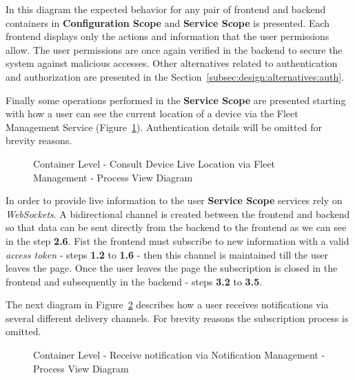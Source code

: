 In this diagram the expected behavior for any pair of frontend and backend containers in \textbf{Configuration Scope} and \textbf{Service Scope} is presented. Each frontend displays only the actions and information that the user permissions allow. The user permissions are once again verified in the backend to secure the system against malicious accesses. Other alternatives related to authentication and authorization are presented in the Section~\ref{subsec:design:alternatives:auth}.

Finally some operations performed in the \textbf{Service Scope} are presented starting with how a user can see the current location of a device via the Fleet Management Service (Figure~\ref{fig:design:architecture:container:process:diagram:fleet}). Authentication details will be omitted for brevity reasons.

\begin{figure}[H]
   \centering
   \resizebox{\columnwidth}{!}
   {
      
   }
   \caption[Container Level - Consult Device Live Location via Fleet Management - Process View Diagram]{Container Level - Consult Device Live Location via Fleet Management - Process View Diagram}
   \label{fig:design:architecture:container:process:diagram:fleet}
\end{figure}

In order to provide live information to the user \textbf{Service Scope} services rely on \textit{WebSockets}. A bidirectional channel is created between the frontend and backend so that data can be sent directly from the backend to the frontend as we can see in the step \textbf{2.6}. Fist the frontend must subscribe to new information with a valid \textit{access token} - steps \textbf{1.2} to \textbf{1.6} - then this channel is maintained till the user leaves the page. Once the user leaves the page the subscription is closed in the frontend and subsequently in the backend - steps \textbf{3.2} to \textbf{3.5}.

The next diagram in Figure~\ref{fig:design:architecture:container:process:diagram:notification} describes how a user receives notifications via several different delivery channels. For brevity reasons the subscription process is omitted.

\begin{figure}[H]
   \centering
   \resizebox{\columnwidth}{!}
   {
      
   }
   \caption[Container Level - Receive notification via Notification Management - Process View Diagram]{Container Level - Receive notification via Notification Management - Process View Diagram}
   \label{fig:design:architecture:container:process:diagram:notification}
\end{figure}

